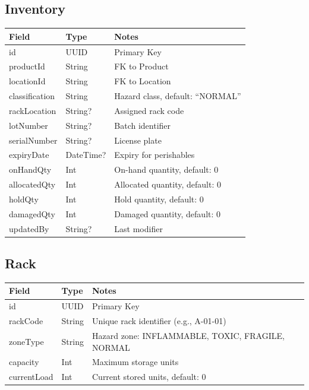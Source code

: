\documentclass[12pt,a4paper]{report}
\begin{document}
\subsection{Inventory}
\begin{table}[H]
    \centering
    \renewcommand{\arraystretch}{1.3}
    \begin{tabularx}{\textwidth}{|l|l|X|}
        \hline
        \textbf{Field} & \textbf{Type} & \textbf{Notes} \\
        \hline
        id & UUID & Primary Key \\
        productId & String & FK to Product \\
        locationId & String & FK to Location \\
        classification & String & Hazard class, default: ``NORMAL'' \\
        rackLocation & String? & Assigned rack code \\
        lotNumber & String? & Batch identifier \\
        serialNumber & String? & License plate \\
        expiryDate & DateTime? & Expiry for perishables \\
        onHandQty & Int & On-hand quantity, default: 0 \\
        allocatedQty & Int & Allocated quantity, default: 0 \\
        holdQty & Int & Hold quantity, default: 0 \\
        damagedQty & Int & Damaged quantity, default: 0 \\
        updatedBy & String? & Last modifier \\
        \hline
    \end{tabularx}
\end{table}

\subsection{Rack}
\begin{table}[H]
    \centering
    \renewcommand{\arraystretch}{1.3}
    \begin{tabularx}{\textwidth}{|l|l|X|}
        \hline
        \textbf{Field} & \textbf{Type} & \textbf{Notes} \\
        \hline
        id & UUID & Primary Key \\
        rackCode & String & Unique rack identifier (e.g., A-01-01) \\
        zoneType & String & Hazard zone: INFLAMMABLE, TOXIC, FRAGILE, NORMAL \\
        capacity & Int & Maximum storage units \\
        currentLoad & Int & Current stored units, default: 0 \\
        \hline
    \end{tabularx}
\end{table}
\end{document}
